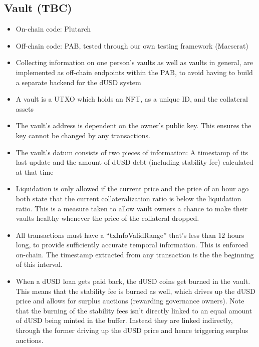 \documentclass{article} %
\begin{document}
\subsection{Vault (TBC)}

\begin{itemize}
  \item On-chain code: Plutarch
  \item Off-chain code: PAB, tested through our own testing framework (Maeserat)
  \item Collecting information on one person's vaults as well as vaults in
    general, are implemented as off-chain endpoints within the PAB, to avoid
    having to build a separate backend for the dUSD system
  \item A vault is a UTXO which holds an NFT, as a unique ID, and the collateral
    assets
  \item The vault's address is dependent on the owner's public key. This ensures
    the key cannot be changed by any transactions.
  \item The vault's datum consists of two pieces of information: A timestamp of
    its last update and the amount of dUSD debt (including stability fee)
    calculated at that time
  \item Liquidation is only allowed if the current price and the price of an
    hour ago both state that the current collateralization ratio is below the
    liquidation ratio.
    This is a measure taken to allow vault owners a chance to make their vaults
    healthy whenever the price of the collateral dropped.
  \item All transactions must have a ``txInfoValidRange'' that's less than $12$
    hours long, to provide sufficiently accurate temporal information. This is
    enforced on-chain. The timestamp extracted from any transaction is the the
    beginning of this interval.
  \item When a dUSD loan gets paid back, the dUSD coins get burned in the vault.
    This means that the stability fee is burned as well, which drives up the
    dUSD price and allows for surplus auctions (rewarding governance owners).
    Note that the burning of the stability fees isn't directly linked to an
    equal amount of dUSD being minted in the buffer.
    Instead they are linked indirectly, through the former driving up the dUSD
    price and hence triggering surplus auctions.
\end{itemize}

\end{document}
